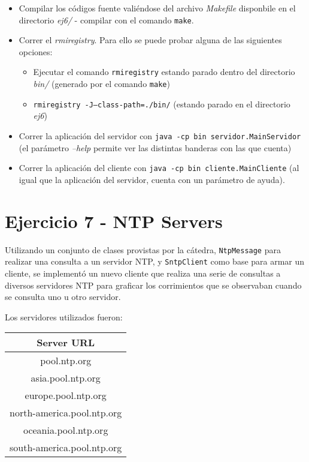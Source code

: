 \begin{itemize}
    \item Compilar los códigos fuente valiéndose del archivo \emph{Makefile} disponbile en el directorio \emph{ej6/} - compilar con el comando \texttt{make}.
    \item Correr el \emph{rmiregistry}. Para ello se puede probar alguna de las siguientes opciones:
    \begin{itemize}
        \item Ejecutar el comando \texttt{rmiregistry} estando parado dentro del directorio \emph{bin/} (generado por el comando \texttt{make})  
        \item \texttt{rmiregistry -J--class-path=./bin/} (estando parado en el directorio \emph{ej6})
    \end{itemize}
    \item Correr la aplicación del servidor con \texttt{java -cp bin servidor.MainServidor} (el parámetro \emph{--help} permite ver las distintas banderas con las que cuenta) 
    \item Correr la aplicación del cliente con \texttt{java -cp bin cliente.MainCliente} (al igual que la aplicación del servidor, cuenta con un parámetro de ayuda). 
\end{itemize}

\section{Ejercicio 7 - NTP Servers}

Utilizando un conjunto de clases provistas por la cátedra, \texttt{NtpMessage} para realizar una consulta a un servidor NTP, y \texttt{SntpClient} como base para armar un cliente,  se implementó un nuevo cliente que realiza una serie de consultas a diversos servidores NTP para graficar los corrimientos que se observaban cuando se consulta uno u otro servidor.

Los servidores utilizados fueron:

\begin{center}
    \begin{tabular}{ c }
        \textbf{Server URL} \\
        \hline
        \hline
        pool.ntp.org \\ 
        asia.pool.ntp.org \\
        europe.pool.ntp.org \\
        north-america.pool.ntp.org \\
        oceania.pool.ntp.org \\ 
        south-america.pool.ntp.org \\ 
    \end{tabular}
\end{center}


